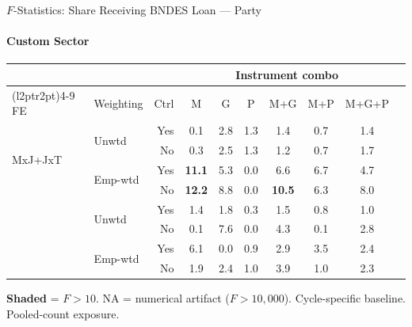 \documentclass[aspectratio=169,10pt]{beamer}
\newcommand{\fpass}[1]{\cellcolor{pass}\textbf{#1}}
\begin{document}
\begin{frame}[t]{$F$-Statistics: Share Receiving BNDES Loan --- Party}
\framesubtitle{Custom Sector}
\begin{center}
\footnotesize
\setlength{\tabcolsep}{3.5pt}
\renewcommand{\arraystretch}{1.05}
\begin{tabular}{@{}llrccccccc@{}}
\toprule
 & & & \multicolumn{6}{c}{Instrument combo} \\
\cmidrule(l{2pt}r{2pt}){4-9}
FE & Weighting & Ctrl & M & G & P & M+G & M+P & M+G+P \\
\midrule
  \multirow{4}{*}{MxJ+JxT} & \multirow{2}{*}{Unwtd} & Yes & 0.1 & 2.8 & 1.3 & 1.4 & 0.7 & 1.4 \\
   &  & No & 0.3 & 2.5 & 1.3 & 1.2 & 0.7 & 1.7 \\
   & \multirow{2}{*}{Emp-wtd} & Yes & \fpass{11.1} & 5.3 & 0.0 & 6.6 & 6.7 & 4.7 \\
   &  & No & \fpass{12.2} & 8.8 & 0.0 & \fpass{10.5} & 6.3 & 8.0 \\
\addlinespace[5pt]
  \multirow{4}{*}{MxJ+MxT} & \multirow{2}{*}{Unwtd} & Yes & 1.4 & 1.8 & 0.3 & 1.5 & 0.8 & 1.0 \\
   &  & No & 0.1 & 7.6 & 0.0 & 4.3 & 0.1 & 2.8 \\
   & \multirow{2}{*}{Emp-wtd} & Yes & 6.1 & 0.0 & 0.9 & 2.9 & 3.5 & 2.4 \\
   &  & No & 1.9 & 2.4 & 1.0 & 3.9 & 1.0 & 2.3 \\
\bottomrule
\end{tabular}
\end{center}
{\scriptsize \colorbox{pass}{\textbf{Shaded}} = $F>10$. NA = numerical artifact ($F>10{,}000$). Cycle-specific baseline. Pooled-count exposure.}
\end{frame}
\end{document}
